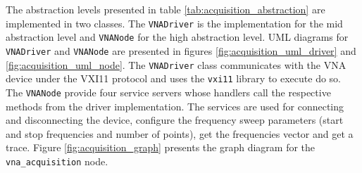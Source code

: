 \documentclass{article}
\begin{document}
The abstraction levels presented in table \ref{tab:acquisition_abstraction} are implemented in two classes. The \texttt{VNADriver} is the implementation for the mid abstraction level and \texttt{VNANode} for the high abstraction level. UML diagrams for \texttt{VNADriver} and \texttt{VNANode} are presented in figures \ref{fig:acquisition_uml_driver} and \ref{fig:acquisition_uml_node}. The \texttt{VNADriver} class communicates with the VNA device under the VXI11 protocol and uses the \texttt{vxi11} library to execute do so. The \texttt{VNANode} provide four service servers whose handlers call the respective methods from the driver implementation. The services are used for connecting and disconnecting the device, configure the frequency sweep parameters (start and stop frequencies and number of points), get the frequencies vector and get a trace. Figure \ref{fig:acquisition_graph} presents the graph diagram for the \texttt{vna\_acquisition} node.
\end{document}
